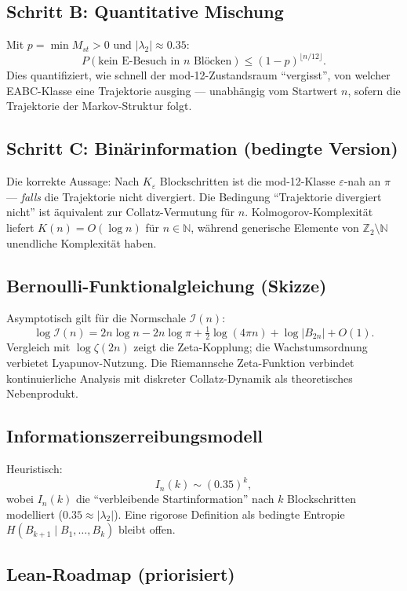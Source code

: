 \documentclass[12pt,a4paper]{article}
\newcommand{\N}{\mathbb{N}}
\newcommand{\Ztwo}{\mathbb{Z}_2}
\begin{document}
\subsection{Schritt B: Quantitative Mischung}

Mit $p=\min M_{st}>0$ und $|\lambda_2|\approx 0.35$:
\[
  P(\text{kein E-Besuch in }n\text{ Blöcken})\leq (1-p)^{\lfloor n/12\rfloor}.
\]
Dies quantifiziert, wie schnell der mod-12-Zustandsraum ``vergisst'',
von welcher EABC-Klasse eine Trajektorie ausging --- unabhängig vom
Startwert $n$, sofern die Trajektorie der Markov-Struktur folgt.

\subsection{Schritt C: Binärinformation (bedingte Version)}

Die korrekte Aussage: Nach $K_\varepsilon$ Blockschritten ist die mod-12-Klasse
$\varepsilon$-nah an $\pi$ --- \emph{falls} die Trajektorie nicht divergiert.
Die Bedingung ``Trajektorie divergiert nicht'' ist äquivalent zur
Collatz-Vermutung für $n$. Kolmogorov-Komplexität liefert $K(n)=O(\log n)$
für $n\in\N$, während generische Elemente von $\Ztwo\setminus\N$ unendliche
Komplexität haben.

\subsection{Bernoulli-Funktionalgleichung (Skizze)}

Asymptotisch gilt für die Normschale $\mathcal{I}(n)$:
\[
  \log \mathcal{I}(n) = 2n\log n - 2n\log\pi + \tfrac{1}{2}\log(4\pi n) + \log|B_{2n}| + O(1).
\]
Vergleich mit $\log\zeta(2n)$ zeigt die Zeta-Kopplung; die Wachstumsordnung
verbietet Lyapunov-Nutzung. Die Riemannsche Zeta-Funktion verbindet
kontinuierliche Analysis mit diskreter Collatz-Dynamik als theoretisches
Nebenprodukt.

\subsection{Informationszerreibungsmodell}

Heuristisch:
\[
  I_n(k) \sim (0.35)^k,
\]
wobei $I_n(k)$ die ``verbleibende Startinformation'' nach $k$ Blockschritten
modelliert ($0.35 \approx |\lambda_2|$). Eine rigorose Definition als
bedingte Entropie $H(B_{k+1}\mid B_1,\ldots,B_k)$ bleibt offen.

\subsection{Lean-Roadmap (priorisiert)}
\end{document}
